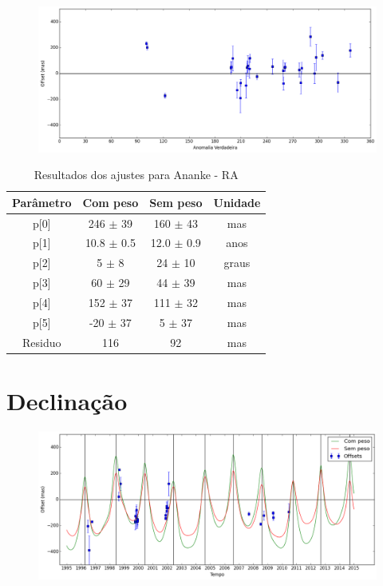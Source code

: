 \documentclass[11pt,a4paper]{report}
\begin{document}
\begin{figure}[h]
\includegraphics[scale=0.45]{Ananke/RA_anom.png}  
\end{figure}

\begin{table}[h!]
\caption{\label{Tab: Ananke-RA} Resultados dos ajustes para Ananke - RA}
\begin{centering}
\begin{tabular}{cccc}
\hline
\hline
Parâmetro & Com peso & Sem peso & Unidade\tabularnewline
\hline
p[0] & 246 $\pm$ 39 & 160 $\pm$ 43 & mas\\
p[1] & 10.8 $\pm$ 0.5 & 12.0 $\pm$ 0.9 & anos\\
p[2] & 5 $\pm$ 8 & 24 $\pm$ 10 & graus\\
p[3] & 60 $\pm$ 29 & 44 $\pm$ 39 & mas\\
p[4] & 152 $\pm$ 37 & 111 $\pm$ 32 & mas\\
p[5] & -20 $\pm$ 37 & 5 $\pm$ 37 & mas\\
Residuo & 116 & 92 & mas\\
\hline 
\end{tabular} 
\par\end{centering}
\end{table}

\section*{Declinação}


\begin{figure}[h]
\begin{centering}
\includegraphics[scale=0.45]{Ananke/DEC.png}
\end{centering}
\end{figure}
\end{document}
